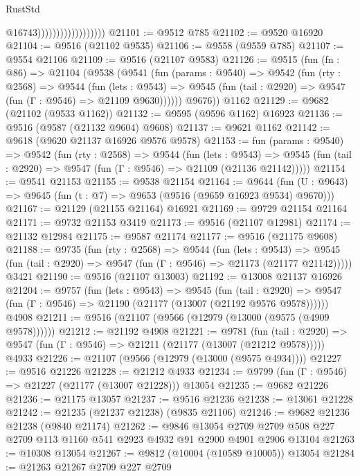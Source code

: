 \begin{lexlean}{RustStd}
\begin{coremodule}
                                        @16743))))))))))))))))))
@21101 := @9512 @785
@21102 := @9520 @16920
@21104 := @9516 (@21102 @9535)
@21106 := @9558 (@9559 @785)
@21107 := @9554 @21106
@21109 := @9516 (@21107 @9583)
@21126 := @9515
    (fun (fn : @86) =>
    @21104
      (@9538
        (@9541
          (fun (params : @9540) =>
          @9542
            (fun (rty : @2568) =>
            @9544
              (fun (lets : @9543) =>
              @9545 (fun (tail : @2920) => @9547 (fun (Γ : @9546) => @21109 @9630))))))
        @9676))
    @1162
@21129 := @9682 (@21102 (@9533 @1162))
@21132 := @9595 (@9596 @1162) @16923
@21136 := @9516 (@9587 (@21132 @9604) @9608)
@21137 := @9621 @1162
@21142 := @9618 (@9620 @21137 @16926 @9576 @9578)
@21153 := fun (params : @9540) =>
  @9542
    (fun (rty : @2568) =>
    @9544
      (fun (lets : @9543) =>
      @9545 (fun (tail : @2920) => @9547 (fun (Γ : @9546) => @21109 (@21136 @21142)))))
@21154 := @9541 @21153
@21155 := @9538 @21154
@21164 := @9644
    (fun (U : @9643) => @9645 (fun (t : @7) => @9653 (@9516 (@9659 @16923 @9534) @9670)))
@21167 := @21129 (@21155 @21164) @16921
@21169 := @9729 @21154 @21164
@21171 := @9732 @21153 @3419
@21173 := @9516 (@21107 @12981)
@21174 := @21132 @12984
@21175 := @9587 @21174
@21177 := @9516 (@21175 @9608)
@21188 := @9735
    (fun (rty : @2568) =>
    @9544
      (fun (lets : @9543) =>
      @9545 (fun (tail : @2920) => @9547 (fun (Γ : @9546) => @21173 (@21177 @21142)))))
    @3421
@21190 := @9516 (@21107 @13003)
@21192 := @13008 @21137 @16926
@21204 := @9757
    (fun (lets : @9543) =>
    @9545
      (fun (tail : @2920) =>
      @9547 (fun (Γ : @9546) => @21190 (@21177 (@13007 (@21192 @9576 @9578))))))
    @4908
@21211 := @9516 (@21107 (@9566 (@12979 (@13000 (@9575 (@4909 @9578))))))
@21212 := @21192 @4908
@21221 := @9781
    (fun (tail : @2920) => @9547 (fun (Γ : @9546) => @21211 (@21177 (@13007 (@21212 @9578)))))
    @4933
@21226 := @21107 (@9566 (@12979 (@13000 (@9575 @4934))))
@21227 := @9516 @21226
@21228 := @21212 @4933
@21234 := @9799 (fun (Γ : @9546) => @21227 (@21177 (@13007 @21228))) @13054
@21235 := @9682 @21226
@21236 := @21175 @13057
@21237 := @9516 @21236
@21238 := @13061 @21228
@21242 := @21235 (@21237 @21238) (@9835 @21106)
@21246 := @9682 @21236 @21238 (@9840 @21174)
@21262 := @9846
    @13054
    @2709
    @2709
    @508
    @227
    @2709
    @113
    @1160
    @541
    @2923
    @4932
    @91
    @2900
    @4901
    @2906
    @13104
@21263 := @10308 @13054
@21267 := @9812 (@10004 (@10589 @10005)) @13054
@21284 := @21263
    @21267
    @2709
    @227
    @2709

\end{coremodule}
\end{lexlean}
